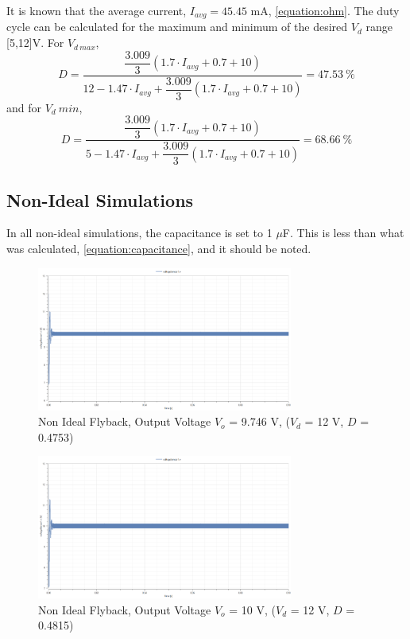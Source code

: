 \documentclass[12pt,twoside]{scrartcl}
\begin{document}
    It is known that the average current, $I_{avg} = 45.45$ mA, \ref{equation:ohm}. The duty cycle can 
    be calculated for the maximum and minimum of the desired $V_d$ range [5,12]V. For $V_{d\:max}$,
    \begin{equation}
        D  = \frac{\dfrac{3.009}{3}(1.7\cdot I_{avg} + 0.7 + 10)}{12 - 1.47\cdot I_{avg} + \dfrac{3.009}{3}(1.7\cdot I_{avg} + 0.7 + 10)} = 47.53\: \%
    \end{equation}
    and for $V_d\:min$,
    \begin{equation}
        D  = \frac{\dfrac{3.009}{3}(1.7\cdot I_{avg} + 0.7 + 10)}{5 - 1.47\cdot I_{avg} + \dfrac{3.009}{3}(1.7\cdot I_{avg} + 0.7 + 10)} = 68.66\: \%
    \end{equation}

\newpage

\subsection{Non-Ideal Simulations}
In all non-ideal simulations, the capacitance is set to 1 $\mu$F. This is less than what was calculated, \ref{equation:capacitance}, and it should be noted.
\begin{figure}[htp]
    \centering
    \includegraphics[width=0.75\textwidth]{NonIdealSim12V(calculated).png}
    \caption{Non Ideal Flyback, Output Voltage $V_o$ = 9.746 V, ($V_d$ = 12 V, $D$ = 0.4753)}
    \label{fig:NonIdealSim12Vcal}
\end{figure}

\begin{figure}[htp]
    \centering
    \includegraphics[width=0.75\textwidth]{NonIdealSim12V(tested).png}
    \caption{Non Ideal Flyback, Output Voltage $V_o$ = 10 V, ($V_d$ = 12 V, $D$ = 0.4815)}
    \label{fig:NonIdealSim12Vtested}
\end{figure}
\end{document}
